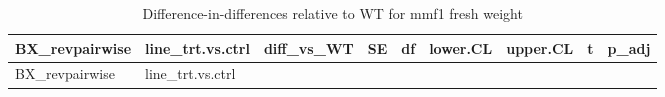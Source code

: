 \documentclass[
  10pt,
]{article}
\begin{document}
\begin{longtable}[]{@{}
  >{\raggedright\arraybackslash}p{}
  >{\raggedright\arraybackslash}p{}
  >{\raggedleft\arraybackslash}p{}
  >{\raggedleft\arraybackslash}p{}
  >{\raggedleft\arraybackslash}p{}
  >{\raggedleft\arraybackslash}p{}
  >{\raggedleft\arraybackslash}p{}
  >{\raggedleft\arraybackslash}p{}
  >{\raggedleft\arraybackslash}p{}@{}}
\caption{Difference-in-differences relative to WT for mmf1 fresh
weight}\tabularnewline
\toprule\noalign{}
\begin{minipage}[b]{\linewidth}\raggedright
BX\_revpairwise
\end{minipage} & \begin{minipage}[b]{\linewidth}\raggedright
line\_trt.vs.ctrl
\end{minipage} & \begin{minipage}[b]{\linewidth}\raggedleft
diff\_vs\_WT
\end{minipage} & \begin{minipage}[b]{\linewidth}\raggedleft
SE
\end{minipage} & \begin{minipage}[b]{\linewidth}\raggedleft
df
\end{minipage} & \begin{minipage}[b]{\linewidth}\raggedleft
lower.CL
\end{minipage} & \begin{minipage}[b]{\linewidth}\raggedleft
upper.CL
\end{minipage} & \begin{minipage}[b]{\linewidth}\raggedleft
t
\end{minipage} & \begin{minipage}[b]{\linewidth}\raggedleft
p\_adj
\end{minipage} \\
\midrule\noalign{}
\endfirsthead
\toprule\noalign{}
\begin{minipage}[b]{\linewidth}\raggedright
BX\_revpairwise
\end{minipage} & \begin{minipage}[b]{\linewidth}\raggedright
line\_trt.vs.ctrl
\end{minipage} & \begin{minipage}[b]{\linewidth}\raggedleft

\end{minipage}
\end{longtable}
\end{document}
